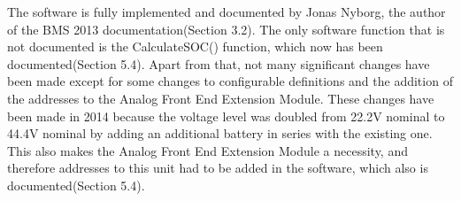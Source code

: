 The software is fully implemented and documented by Jonas Nyborg, the author of the BMS 2013 documentation\cite{BMSDocumentation}(Section 3.2). The only software function that is not documented is the CalculateSOC() function, which now has been documented\cite{AU2}(Section 5.4). Apart from that, not many significant changes have been made except for some changes to configurable definitions and the addition of the addresses to the Analog Front End Extension Module. These changes have been made in 2014 because the voltage level was doubled from 22.2V nominal to 44.4V nominal by adding an additional battery in series with the existing one. This also makes the Analog Front End Extension Module a necessity, and therefore addresses to this unit had to be added in the software, which also is documented\cite{AU2}(Section 5.4).   